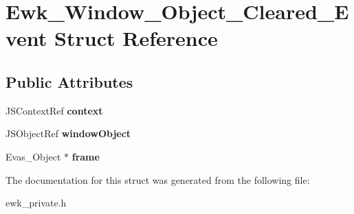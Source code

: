\hypertarget{structEwk__Window__Object__Cleared__Event}{\section{Ewk\+\_\+\+Window\+\_\+\+Object\+\_\+\+Cleared\+\_\+\+Event Struct Reference}
\label{structEwk__Window__Object__Cleared__Event}
}
\subsection*{Public Attributes}
\begin{DoxyCompactItemize}
\item 
\hypertarget{structEwk__Window__Object__Cleared__Event_a674795bdfc7de35179b00417b44a0689}{J\+S\+Context\+Ref {\bfseries context}}\label{structEwk__Window__Object__Cleared__Event_a674795bdfc7de35179b00417b44a0689}

\item 
\hypertarget{structEwk__Window__Object__Cleared__Event_a175bcfdb52a35e1bae500c81663f5d90}{J\+S\+Object\+Ref {\bfseries window\+Object}}\label{structEwk__Window__Object__Cleared__Event_a175bcfdb52a35e1bae500c81663f5d90}

\item 
\hypertarget{structEwk__Window__Object__Cleared__Event_afd9a66efb233dd4aa85e7c82b819e307}{Evas\+\_\+\+Object $\ast$ {\bfseries frame}}\label{structEwk__Window__Object__Cleared__Event_afd9a66efb233dd4aa85e7c82b819e307}

\end{DoxyCompactItemize}


The documentation for this struct was generated from the following file\+:\begin{DoxyCompactItemize}
\item 
ewk\+\_\+private.\+h\end{DoxyCompactItemize}
